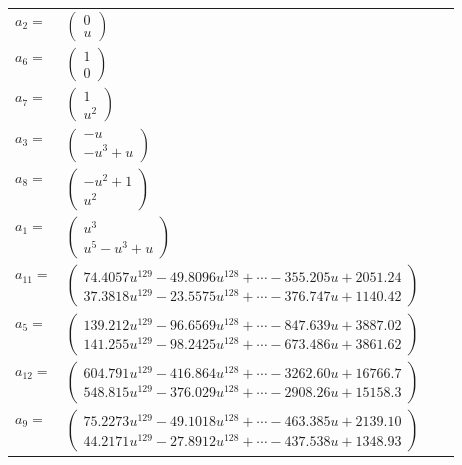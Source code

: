 \documentclass[1p]{elsarticle_modified}
\theoremstyle{definition}
\begin{document}
\begin{tabular}{m{7pt} m{180pt} m{7pt} m{180pt} }
\flushright $a_{2}=$&$\begin{pmatrix}0\\u\end{pmatrix}$ \\
\flushright $a_{6}=$&$\begin{pmatrix}1\\0\end{pmatrix}$ \\
\flushright $a_{7}=$&$\begin{pmatrix}1\\u^2\end{pmatrix}$ \\
\flushright $a_{3}=$&$\begin{pmatrix}- u\\- u^3+u\end{pmatrix}$ \\
\flushright $a_{8}=$&$\begin{pmatrix}- u^2+1\\u^2\end{pmatrix}$ \\
\flushright $a_{1}=$&$\begin{pmatrix}u^3\\u^5- u^3+u\end{pmatrix}$ \\
\flushright $a_{11}=$&$\begin{pmatrix}74.4057 u^{129}-49.8096 u^{128}+\cdots-355.205 u+2051.24\\37.3818 u^{129}-23.5575 u^{128}+\cdots-376.747 u+1140.42\end{pmatrix}$ \\
\flushright $a_{5}=$&$\begin{pmatrix}139.212 u^{129}-96.6569 u^{128}+\cdots-847.639 u+3887.02\\141.255 u^{129}-98.2425 u^{128}+\cdots-673.486 u+3861.62\end{pmatrix}$ \\
\flushright $a_{12}=$&$\begin{pmatrix}604.791 u^{129}-416.864 u^{128}+\cdots-3262.60 u+16766.7\\548.815 u^{129}-376.029 u^{128}+\cdots-2908.26 u+15158.3\end{pmatrix}$ \\
\flushright $a_{9}=$&$\begin{pmatrix}75.2273 u^{129}-49.1018 u^{128}+\cdots-463.385 u+2139.10\\44.2171 u^{129}-27.8912 u^{128}+\cdots-437.538 u+1348.93\end{pmatrix}$ \\

\end{tabular}
\end{document}
